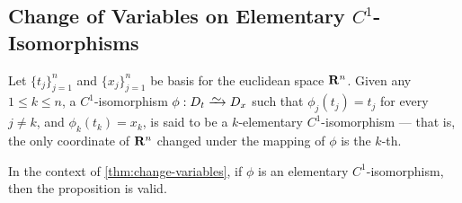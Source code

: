 \subsection{Change of Variables on Elementary
\texorpdfstring{\(C^1\)}{C1}-Isomorphisms}

\begin{definition}
\label{def:elementary-C1-isomorphism-Rn}
Let \(\{t_{j}\}_{j=1}^n\) and \(\{x_{j}\}_{j = 1}^n\) be basis for the euclidean
space \(\mathbf{R}^n\). Given any \(1 \leq k \leq n\), a \(C^1\)-isomorphism \(\phi: D_t
\isoto D_x\) such that \(\phi_j(t_j) = t_j\) for every \(j \neq k\), and
\(\phi_k(t_{k}) = x_k\), is said to be a \(k\)-elementary \(C^1\)-isomorphism ---
that is, the only coordinate of \(\mathbf{R}^n\) changed under the mapping of \(\phi\)
is the \(k\)-th.
\end{definition}

\begin{lemma}
\label{lem:change-variables-elementary-C1-isomorphism}
In the context of \cref{thm:change-variables}, if \(\phi\) is an elementary
\(C^1\)-isomorphism, then the proposition is valid.
\end{lemma}

